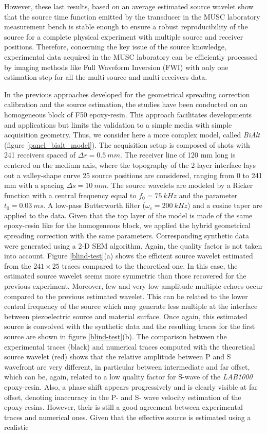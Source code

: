 \documentclass[manuscript,revised]{geophysics}
\newcommand{\twod}{2-D }
\newcommand{\bialt}{\textit{BiAlt} }
\begin{document}
\noindent However, these last results, based on an average estimated source wavelet show that the source time function emitted by the transducer in the MUSC laboratory measurement bench is stable enough to ensure a robust reproducibility of the source for a complete physical experiment with multiple source and receiver positions. Therefore, concerning the key issue of the source knowledge, experimental data acquired in the MUSC laboratory can be efficiently processed by imaging methods like Full Waveform Inversion (FWI) with only one estimation step for all the multi-source and multi-receivers data.

\noindent In the previous approaches developed for the geometrical spreading correction calibration and the source estimation, the studies have been conducted on an homogeneous block of F50 epoxy-resin. This approach facilitates developments and applications but limits the validation to a simple media with simple acquisition geometry. Thus, we consider here a more complex model, called \bialt (figure \ref{panel_bialt_model}). The acquisition setup is composed of shots with 241 receivers spaced of $\Delta r=0.5\ mm$. The receiver line of 120 mm long is centered on the medium axis, where the topography of the 2-layer interface lays out a valley-shape curve 25 source positions are considered, ranging from 0 to 241 mm with a spacing $\Delta s=10\ mm$. The source wavelets are modeled by a Ricker function with a central frequency equal to $f_{0}=75\ kHz$ and the parameter $t_{0}=0.03\ ms$. A low-pass Butterworth filter ($\omega_{c}=200\ kHz$) and a cosine taper are applied to the data. Given that the top layer of the model is made of the same epoxy-resin like for the homogeneous block, we applied the hybrid geometrical spreading correction with the same parameters. Corresponding synthetic data were generated using a \twod  SEM algorithm. Again, the quality factor is not taken into account. Figure \ref{blind-test}(a) shows the efficient source wavelet estimated from the $241 \times 25$ traces compared to the theoretical one. In this case, the estimated source wavelet seems more symmetric than those recovered for the previous experiment. Moreover, few and very low amplitude multiple echoes occur compared to the previous estimated wavelet. This can be related to the lower central frequency of the source which may generate less multiple at the interface between piezoelectric source and material surface. Once again, this estimated source is convolved with the synthetic data and the resulting traces  for the first source are shown in figure \ref{blind-test}(b). The comparison between the experimental traces (black) and numerical traces computed with the theoretical source wavelet (red) shows that the relative amplitude between P and S wavefront are very different, in particular between intermediate and far offset, which can be, again, related to a low quality factor for S-wave of the \textit{LAB1000} epoxy-resin. Also, a phase shift appears progressively and is clearly visible at far offset, denoting inaccuracy in the P- and S- wave velocity estimation of the epoxy-resins. However, their is still a good agreement between experimental traces and numerical ones. Given that the effective source is estimated using a realistic 
\end{document}
